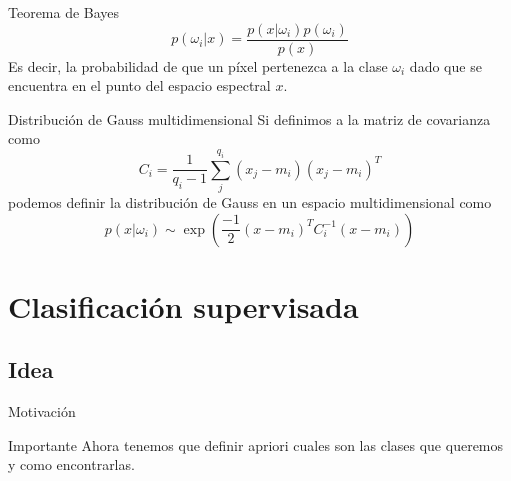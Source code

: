 \documentclass[]{beamer}
\begin{document}
\begin{frame}{\subsecname}
  \begin{block}{Teorema de Bayes}
    $$p(\omega_i|x) = \frac{p(x|\omega_i) p(\omega_i)}{p(x)}$$
    Es decir, la probabilidad de que un píxel pertenezca a la clase $\omega_i$ dado que se encuentra en el punto del espacio espectral $x$.
  \end{block}
\end{frame}

\begin{frame}{\subsecname}
  \begin{block}{Distribución de Gauss multidimensional}
    Si definimos a la matriz de covarianza como $$C_i = \frac{1}{q_i-1} \sum_j^{q_i} (x_j-m_i)(x_j-m_i)^T$$ podemos definir la distribución de Gauss en un espacio multidimensional como $$p(x|\omega_i) \sim \exp (\frac{-1}{2} (x-m_i)^T C_i^{-1} (x-m_i) )$$
  \end{block}
\end{frame}

\section{Clasificación supervisada}
\subsection{Idea}
\begin{frame}{Motivación}
  \begin{center}
    \end{center}
\end{frame}

\begin{frame}{\subsecname}
  \begin{alertblock}{Importante}
    Ahora tenemos que definir apriori cuales son las clases que queremos y como encontrarlas.
  \end{alertblock}
\end{frame}
\end{document}
